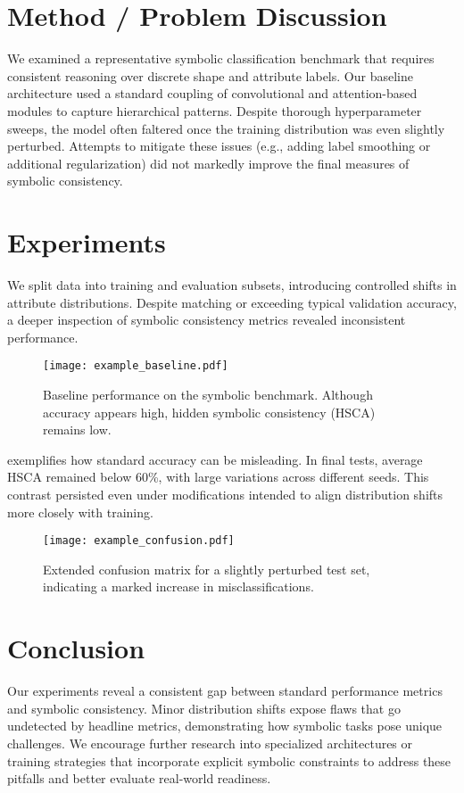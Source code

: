 \documentclass{article}
\begin{document}
\section{Method / Problem Discussion}
We examined a representative symbolic classification benchmark that requires consistent reasoning over discrete shape and attribute labels. Our baseline architecture used a standard coupling of convolutional and attention-based modules to capture hierarchical patterns. Despite thorough hyperparameter sweeps, the model often faltered once the training distribution was even slightly perturbed. Attempts to mitigate these issues (e.g., adding label smoothing or additional regularization) did not markedly improve the final measures of symbolic consistency.

\section{Experiments}
\label{sec:experiments}
We split data into training and evaluation subsets, introducing controlled shifts in attribute distributions. Despite matching or exceeding typical validation accuracy, a deeper inspection of symbolic consistency metrics revealed inconsistent performance.

\begin{figure}[t]
    \centering
    \texttt{[image: example\_baseline.pdf]}
    \caption{Baseline performance on the symbolic benchmark. Although accuracy appears high, hidden symbolic consistency (HSCA) remains low.}
    \label{fig:baseline}
\end{figure}

 exemplifies how standard accuracy can be misleading. In final tests, average HSCA remained below 60\%, with large variations across different seeds. This contrast persisted even under modifications intended to align distribution shifts more closely with training.

\begin{figure}[t]
    \centering
    \texttt{[image: example\_confusion.pdf]}
    \caption{Extended confusion matrix for a slightly perturbed test set, indicating a marked increase in misclassifications.}
    \label{fig:confmatrix}
\end{figure}

\section{Conclusion}
Our experiments reveal a consistent gap between standard performance metrics and symbolic consistency. Minor distribution shifts expose flaws that go undetected by headline metrics, demonstrating how symbolic tasks pose unique challenges. We encourage further research into specialized architectures or training strategies that incorporate explicit symbolic constraints to address these pitfalls and better evaluate real-world readiness.
\end{document}
